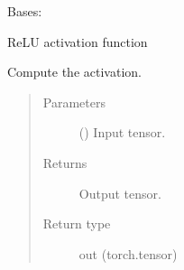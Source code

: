 \documentclass[letterpaper,10pt,english,openany,oneside]{sphinxmanual}
\begin{document}

\begin{fulllineitems}
\label{\detokenize{nn:nn.activation.ReLU}}
Bases: {\hyperref[\detokenize{nn:nn.activation.Activation}]{}}

ReLU activation function

\begin{fulllineitems}
\label{\detokenize{nn:nn.activation.ReLU.forward}}
Compute the activation.
\begin{quote}\begin{description}
\item[{Parameters}] \leavevmode
{} () \textendash{} Input tensor.

\item[{Returns}] \leavevmode
Output tensor.

\item[{Return type}] \leavevmode
out (torch.tensor)

\end{description}\end{quote}

\end{fulllineitems}


\end{fulllineitems}

\end{document}
